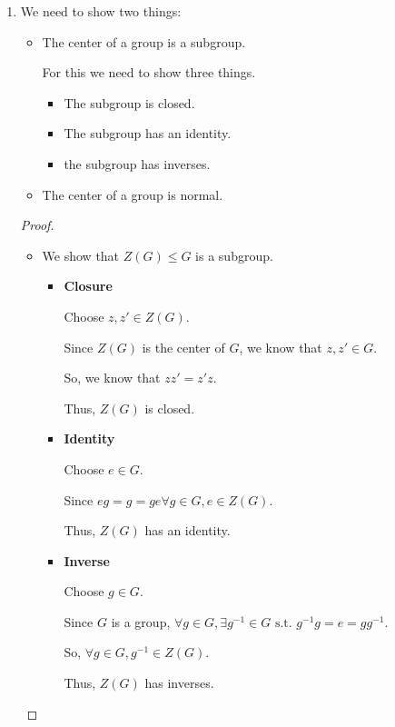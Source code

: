 \documentclass[12pt,letterpaper]{article}
\begin{document}
\begin{enumerate}
    \item
      We need to show two things:
      \begin{itemize}
        \item The center of a group is a subgroup.

          For this we need to show three things.
          \begin{itemize}
            \item The subgroup is closed.
            \item The subgroup has an identity.
            \item the subgroup has inverses.
          \end{itemize}
        \item The center of a group is normal.
      \end{itemize}

      \begin{proof}
        \begin{itemize}
          \item We show that $Z(G) \le G$ is a subgroup.

            \begin{itemize}
              \item \textbf{Closure}

                Choose $z, z' \in Z(G)$.

                Since $Z(G)$ is the center of $G$, we know that $z, z' \in G$.

                So, we know that $zz' = z'z$.

                Thus, $Z(G)$ is closed.

              \item \textbf{Identity}

                Choose $e \in G$.

                Since $eg = g = ge \forall g \in G, e \in Z(G)$.

                Thus, $Z(G)$ has an identity.

              \item \textbf{Inverse}

                Choose $g \in G$.

                Since $G$ is a group,
                $\forall g \in G, \exists g^{-1} \in G \text{ s.t. } g^{-1}g = e = gg^{-1}$.

                So, $\forall g \in G, g^{-1} \in Z(G)$.

                Thus, $Z(G)$ has inverses.
            \end{itemize}


\end{itemize}
\end{proof}
\end{enumerate}
\end{document}
